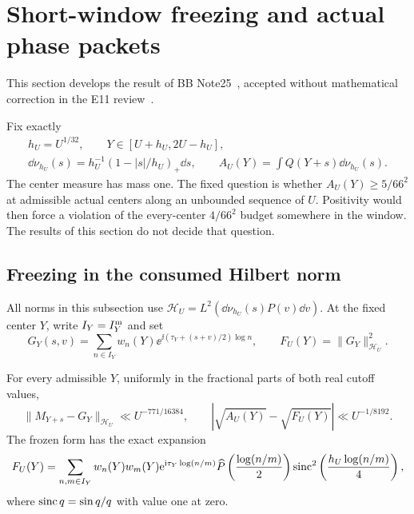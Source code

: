 \section{Short-window freezing and actual phase packets}\label{sec:packets}

This section develops the result of BB Note25~\cite{BB25}, accepted
without mathematical correction in the E11 review~\cite{BBReview11}.

Fix exactly
\begin{equation}\label{eq:short-window}
 \begin{gathered}
 h_U=U^{1/32},\qquad Y\in[U+h_U,2U-h_U],\\
 \dd\nu_{h_U}(s)=h_U^{-1}(1-|s|/h_U)_+\dd s,\qquad
 A_U(Y)=\int Q(Y+s)\dd\nu_{h_U}(s).
 \end{gathered}
\end{equation}
The center measure has mass one. The fixed question is whether
$A_U(Y)\ge5/66^2$ at admissible actual centers along an unbounded
sequence of $U$. Positivity would then force a violation of the
every-center $4/66^2$ budget somewhere in the window.
The results of this section do not decide that question.

\subsection{Freezing in the consumed Hilbert norm}

All norms in this subsection use
$\mathcal H_U=L^2(\dd\nu_{h_U}(s)P(v)\dd v)$.
At the fixed center $Y$, write $I_Y=I_Y^{\rm m}$ and set
\[
 G_Y(s,v)=\sum_{n\in I_Y}w_n(Y)
      \ee^{\ii(\tau_Y+(s+v)/2)\log n},\qquad
 F_U(Y)=\|G_Y\|_{\mathcal H_U}^2.
\]
\begin{theorem}\label{thm:freezing}
For every admissible $Y$, uniformly in the fractional parts of both
real cutoff values,
\begin{equation}\label{eq:freezing}
 \|M_{Y+s}-G_Y\|_{\mathcal H_U}\ll U^{-771/16384},\qquad
 |\sqrt{A_U(Y)}-\sqrt{F_U(Y)}|\ll U^{-1/8192}.
\end{equation}
The frozen form has the exact expansion
\begin{equation}\label{eq:frozen-form}
 F_U(Y)=\sum_{n,m\in I_Y}w_n(Y)w_m(Y)\mathrm e^{\mathrm i\tau_Y\log(n/m)}
 \widehat P\left(\frac{\log(n/m)}2\right)
 \operatorname{sinc}^2\left(\frac{h_U\log(n/m)}4\right),
\end{equation}
where $\operatorname{sinc} q=\sin q/q$ with value one at zero.
\end{theorem}

